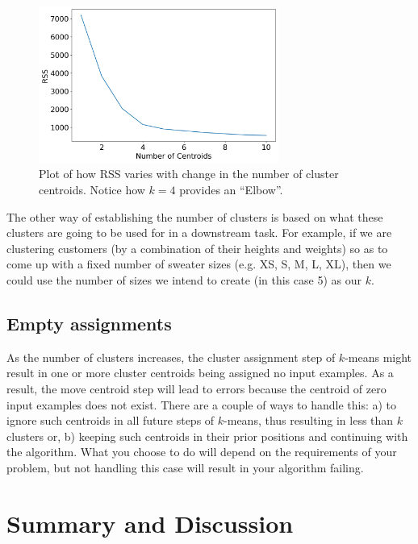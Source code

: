 \begin{figure}
    \centering
    \includegraphics[width=0.7\textwidth]{"Part 3 - Learning Systems/Unsupervised Learning/k-Means/images/Elbow.png"}
         \caption{Plot of how RSS varies with change in the number of cluster centroids. Notice how $k = 4$ provides an ``Elbow''.}
         \label{fig:elbow}
\end{figure}
     

The other way of establishing the number of clusters is based on what these clusters are going to be used for in a downstream task. For example, if we are clustering customers (by a combination of their heights and weights) so as to come up with a fixed number of sweater sizes (e.g. XS, S, M, L, XL), then we could use the number of sizes we intend to create (in this case 5) as our $k$. 

\subsection{Empty assignments}

As the number of clusters increases, the cluster assignment step of $k$-means might result in one or more cluster centroids being assigned no input examples. As a result, the move centroid step will lead to errors because the centroid of zero input examples does not exist. There are a couple of ways to handle this: a) to ignore such centroids in all future steps of $k$-means, thus resulting in less than $k$ clusters or, b) keeping such centroids in their prior positions and continuing with the algorithm. What you choose to do will depend on the requirements of your problem, but not handling this case will result in your algorithm failing. 

\section{Summary and Discussion}

